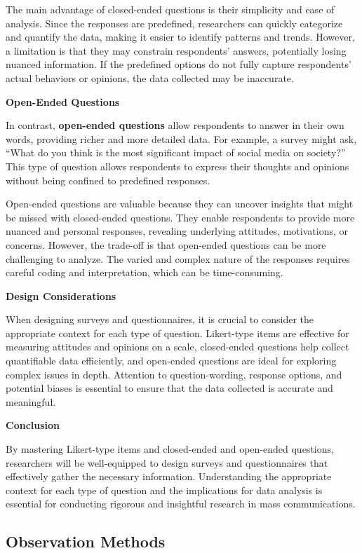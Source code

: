 \documentclass[
]{book}
\begin{document}
The main advantage of closed-ended questions is their simplicity and ease of analysis. Since the responses are predefined, researchers can quickly categorize and quantify the data, making it easier to identify patterns and trends. However, a limitation is that they may constrain respondents' answers, potentially losing nuanced information. If the predefined options do not fully capture respondents' actual behaviors or opinions, the data collected may be inaccurate.

\textbf{Open-Ended Questions}

In contrast, \textbf{open-ended questions} allow respondents to answer in their own words, providing richer and more detailed data. For example, a survey might ask, ``What do you think is the most significant impact of social media on society?'' This type of question allows respondents to express their thoughts and opinions without being confined to predefined responses.

Open-ended questions are valuable because they can uncover insights that might be missed with closed-ended questions. They enable respondents to provide more nuanced and personal responses, revealing underlying attitudes, motivations, or concerns. However, the trade-off is that open-ended questions can be more challenging to analyze. The varied and complex nature of the responses requires careful coding and interpretation, which can be time-consuming.

\textbf{Design Considerations}

When designing surveys and questionnaires, it is crucial to consider the appropriate context for each type of question. Likert-type items are effective for measuring attitudes and opinions on a scale, closed-ended questions help collect quantifiable data efficiently, and open-ended questions are ideal for exploring complex issues in depth. Attention to question-wording, response options, and potential biases is essential to ensure that the data collected is accurate and meaningful.

\textbf{Conclusion}

By mastering Likert-type items and closed-ended and open-ended questions, researchers will be well-equipped to design surveys and questionnaires that effectively gather the necessary information. Understanding the appropriate context for each type of question and the implications for data analysis is essential for conducting rigorous and insightful research in mass communications.

\subsection*{Observation Methods}\label{observation-methods}
\end{document}
